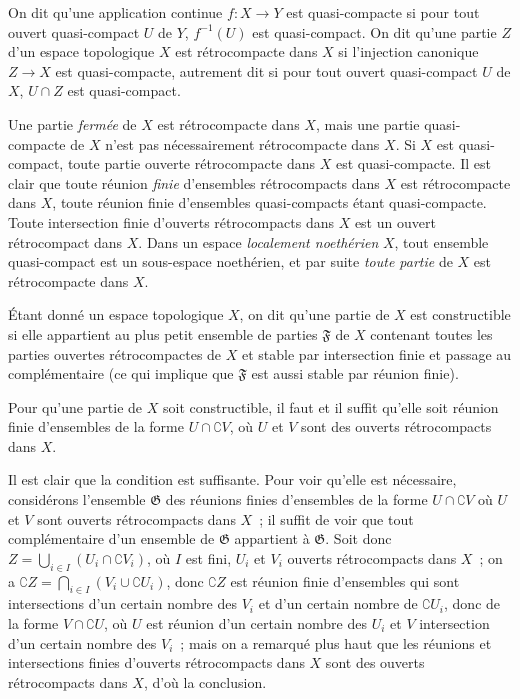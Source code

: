 \begin{definition}[9.1.1]
\label{0.9.1.1-fr}
On dit qu'une application continue $f:X\to Y$ est quasi-compacte si
pour tout ouvert quasi-compact $U$ de $Y$, $f^{-1}(U)$ est quasi-compact. On
dit qu'une partie $Z$ d'un espace topologique $X$ est rétrocompacte
dans $X$ si l'injection canonique $Z\to X$ est quasi-compacte, autrement dit
si pour tout ouvert quasi-compact $U$ de $X$, $U\cap Z$ est quasi-compact.
\end{definition}

Une partie \emph{fermée} de $X$ est rétrocompacte dans $X$, mais une partie
quasi-compacte de $X$ n'est pas nécessairement rétrocompacte dans $X$. Si
$X$ est quasi-compact, toute partie ouverte rétrocompacte dans $X$ est
quasi-compacte. Il est clair que toute réunion \emph{finie} d'ensembles
rétrocompacts dans $X$ est rétrocompacte dans $X$, toute réunion finie
d'ensembles quasi-compacts étant quasi-compacte. Toute intersection finie
d'ouverts rétrocompacts dans $X$ est un ouvert rétrocompact dans $X$. Dans un
espace \emph{localement noethérien} $X$, tout ensemble quasi-compact est un
sous-espace noethérien, et par suite \emph{toute partie} de $X$ est
rétrocompacte dans $X$.

\begin{definition}[9.1.2]
\label{0.9.1.2-fr}
Étant donné un espace topologique $X$, on dit qu'une partie de $X$ est
constructible si elle appartient au plus petit ensemble de parties
$\mathfrak{F}$ de $X$ contenant toutes les parties ouvertes rétrocompactes de
$X$ et stable par intersection finie et passage au complémentaire
\textup{(ce qui implique que $\mathfrak{F}$ est aussi} stable par réunion finie\textup{)}.
\end{definition}

\begin{proposition}[9.1.3]
\label{0.9.1.3-fr}
Pour qu'une partie de $X$ soit constructible, il faut et il suffit qu'elle
soit réunion finie d'ensembles de la forme $U\cap\complement{V}$, où $U$ et
$V$ sont des ouverts rétrocompacts dans $X$.
\end{proposition}

Il est clair que la condition est suffisante. Pour voir qu'elle est
nécessaire, considérons l'ensemble $\mathfrak{G}$ des réunions finies
d'ensembles de la forme $U\cap\complement{V}$ où $U$ et $V$ sont ouverts
rétrocompacts dans $X$~; il suffit de voir que tout complémentaire d'un
ensemble de $\mathfrak{G}$ appartient à $\mathfrak{G}$. Soit donc
$Z=\bigcup_{i\in I}(U_i\cap\complement{V_i})$, où $I$ est fini, $U_i$ et
$V_i$ ouverts rétrocompacts dans $X$~; on a
$\complement{Z}=\bigcap_{i\in I}(V_i\cup\complement{U_i})$, donc
$\complement{Z}$ est réunion finie d'ensembles qui sont intersections d'un
certain nombre des $V_i$ et d'un certain nombre de $\complement{U_i}$, donc
de la forme
$V\cap\complement{U}$, où $U$ est réunion d'un certain nombre des $U_i$ et
$V$ intersection d'un certain nombre des $V_i$~; mais on a remarqué plus
haut que les réunions et intersections finies d'ouverts rétrocompacts dans
$X$ sont des ouverts rétrocompacts dans $X$, d'où la conclusion.

